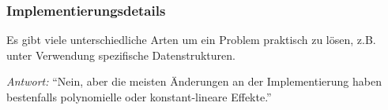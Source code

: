 \documentclass[onlymath]{beamer}
\begin{document}
\begin{frame}\frametitle{Implementierungsdetails}

Es gibt viele unterschiedliche Arten um ein Problem praktisch zu lösen,
z.B. unter Verwendung spezifische Datenstrukturen.\\\smallskip

\pause\bigskip

\emph{Antwort:} "`Nein, aber die meisten Änderungen an der Implementierung haben bestenfalls polynomielle oder konstant-lineare Effekte."'\bigskip



\end{frame}
\end{document}
